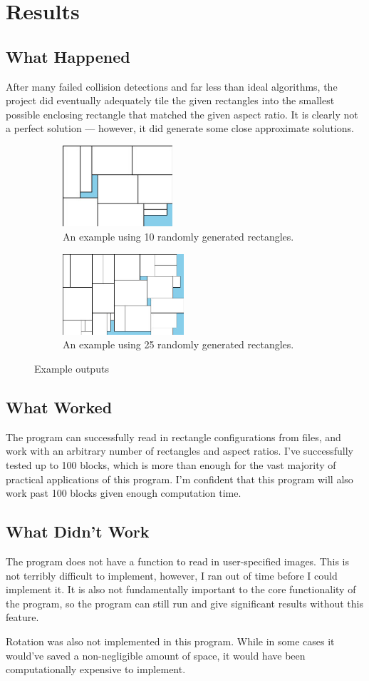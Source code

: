 \documentclass[10pt,titlepage,letterpaper]{article}
\begin{document}
	\section{Results}
	\subsection{What Happened}
	After many failed collision detections and far less than ideal algorithms, the project did eventually adequately tile the given rectangles into the smallest possible enclosing rectangle that matched the given aspect ratio. It is clearly not a perfect solution --- however, it did generate some close approximate solutions.
	\begin{figure}[ht]
		\centering
		\begin{subfigure}{0.40\textwidth}
			\centering
			\includegraphics[height=3cm]{img/10.jpg}
			\caption{An example using 10 randomly generated rectangles.}
		\end{subfigure}
		\begin{subfigure}{0.40\textwidth}
			\centering
			\includegraphics[height=3cm]{img/25.jpg}
			\caption{An example using 25 randomly generated rectangles.}
		\end{subfigure}
		\caption{Example outputs}
	\end{figure}
	\subsection{What Worked}
	The program can successfully read in rectangle configurations from files, and work with an arbitrary number of rectangles and aspect ratios. I've successfully tested up to 100 blocks, which is more than enough for the vast majority of practical applications of this program. I'm confident that this program will also work past 100 blocks given enough computation time.
	\subsection{What Didn't Work}
	The program does not have a function to read in user-specified images. This is not terribly difficult to implement, however, I ran out of time before I could implement it. It is also not fundamentally important to the core functionality of the program, so the program can still run and give significant results without this feature.\par
	Rotation was also not implemented in this program. While in some cases it would've saved a non-negligible amount of space, it would have been computationally expensive to implement.
\end{document}
